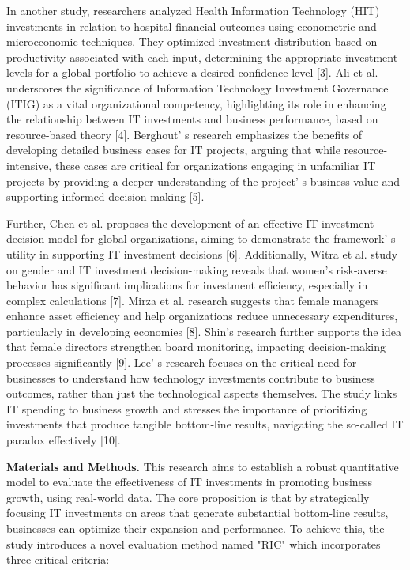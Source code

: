 {In another study, researchers analyzed Health Information Technology
(HIT) investments in relation to hospital financial outcomes using
econometric and microeconomic techniques. They optimized investment
distribution based on productivity associated with each input,
determining the appropriate investment levels for a global portfolio to
achieve a desired confidence level {[}3{]}. Ali et al. underscores the
significance of Information Technology Investment Governance (ITIG) as a
vital organizational competency, highlighting its role in enhancing the
relationship between IT investments and business performance, based on
resource-based theory {[}4{]}. Berghout' s research
emphasizes the benefits of developing detailed business cases for IT
projects, arguing that while resource-intensive, these cases are
critical for organizations engaging in unfamiliar IT projects by
providing a deeper understanding of the project' s
business value and supporting informed decision-making {[}5{]}.

Further, Chen et al. proposes the development of an effective IT
investment decision model for global organizations, aiming to
demonstrate the framework' s utility in supporting IT
investment decisions {[}6{]}. Additionally, Witra et al. study on gender
and IT investment decision-making reveals that women's risk-averse
behavior has significant implications for investment efficiency,
especially in complex calculations {[}7{]}. Mirza et al. research
suggests that female managers enhance asset efficiency and help
organizations reduce unnecessary expenditures, particularly in
developing economies {[}8{]}. Shin's research further supports the idea
that female directors strengthen board monitoring, impacting
decision-making processes significantly {[}9{]}. Lee' s
research focuses on the critical need for businesses to understand how
technology investments contribute to business outcomes, rather than just
the technological aspects themselves. The study links IT spending to
business growth and stresses the importance of prioritizing investments
that produce tangible bottom-line results, navigating the so-called IT
paradox effectively {[}10{]}.

{\bfseries Materials and Methods.} This research aims to establish a robust
quantitative model to evaluate the effectiveness of IT investments in
promoting business growth, using real-world data. The core proposition
is that by strategically focusing IT investments on areas that generate
substantial bottom-line results, businesses can optimize their expansion
and performance. To achieve this, the study introduces a novel
evaluation method named "RIC" which incorporates three critical
criteria:

}
